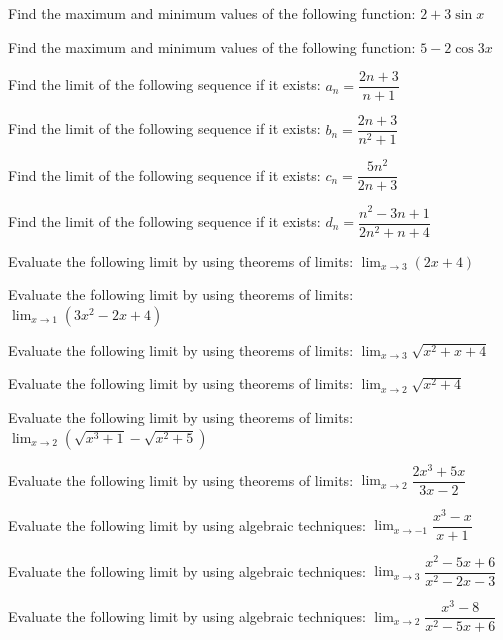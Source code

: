 \documentclass[11pt,a4paper]{article}
\begin{document}
\begin{shortlist}
\item Find the maximum and minimum values of the following function: $2+3\sin x$

\item Find the maximum and minimum values of the following function: $5-2\cos3x$

\item Find the limit of the following sequence if it exists: $a_n=\dfrac{2n+3}{n+1}$

\item Find the limit of the following sequence if it exists: $b_n=\dfrac{2n+3}{n^2+1}$

\item Find the limit of the following sequence if it exists: $c_n=\dfrac{5n^2}{2n+3}$

\item Find the limit of the following sequence if it exists: $d_n=\dfrac{n^2-3n+1}{2n^2+n+4}$

\item Evaluate the following limit by using theorems of limits: $\displaystyle\lim_{x\to3}(2x+4)$

\item Evaluate the following limit by using theorems of limits: $\displaystyle\lim_{x\to1}(3x^2-2x+4)$

\item Evaluate the following limit by using theorems of limits: $\displaystyle\lim_{x\to3}\sqrt{x^2+x+4}$

\item Evaluate the following limit by using theorems of limits: $\displaystyle\lim_{x\to2}\sqrt{x^2+4}$

\item Evaluate the following limit by using theorems of limits: $\displaystyle\lim_{x\to2}\left(\sqrt{x^3+1}-\sqrt{x^2+5}\right)$

\item Evaluate the following limit by using theorems of limits: $\displaystyle\lim_{x\to2}\dfrac{2x^3+5x}{3x-2}$

\item Evaluate the following limit by using algebraic techniques: $\displaystyle\lim_{x\to-1}\dfrac{x^3-x}{x+1}$

\item Evaluate the following limit by using algebraic techniques: $\displaystyle\lim_{x\to3}\dfrac{x^2-5x+6}{x^2-2x-3}$

\item Evaluate the following limit by using algebraic techniques: $\displaystyle\lim_{x\to2}\dfrac{x^3-8}{x^2-5x+6}$


\end{shortlist}
\end{document}
